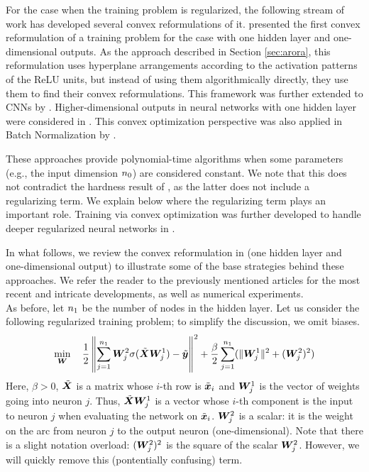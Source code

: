 For the case when the training problem is regularized, the following stream of work has developed several convex reformulations of it.
%
\cite{pilanci2020neural} presented the first convex reformulation of a training problem for the case with one hidden layer and one-dimensional outputs. As the approach described in Section \ref{sec:arora}, this reformulation uses hyperplane arrangements according to the activation patterns of the ReLU units, but instead of using them algorithmically directly, they use them to find their convex reformulations. 
%
This framework was further extended to CNNs by \cite{ergen2021implicit}.
%
Higher-dimensional outputs in neural networks with one hidden layer were considered in \cite{pmlr-v108-ergen20a,ergen2021convex,sahiner2021vectoroutput}. This convex optimization perspective was also applied in Batch Normalization by \cite{ergen2022demystifying}. 
%

These approaches provide polynomial-time algorithms when some parameters (e.g., the input dimension ${n_0}$) are considered constant. We note that this does not contradict the hardness result of \cite{froese2023training}, as the latter does not include a regularizing term. We explain below where the regularizing term plays an important role.
%
Training via convex optimization was further developed to handle deeper regularized neural networks in \cite{ergen2021global,ergen2021path,ergen2021revealing}.

In what follows, we review the convex reformulation in \cite{pilanci2020neural} (one hidden layer and one-dimensional output) to illustrate some of the base strategies behind these approaches.
%
We refer the reader to the previously mentioned articles for the most recent and intricate developments, as well as numerical experiments.\\

As before, let $n_1$ be the number of nodes in the hidden layer. Let us consider the following regularized training problem; to simplify the discussion, we omit biases.
%
\begin{equation}
    \label{eq:ERMproblemCVX}
    \min_{{\bm{W}}} \quad \frac{1}{2} \left\|\sum_{j=1}^{n_1} {\bm{W}}^2_j\sigma(\tilde{{\bm{X}}}{\bm{W}}^1_j) - \tilde{{\bm{y}}} \right\|^2 + 
    \frac{\beta}{2}\sum_{j=1}^{n_1}( \| {\bm{W}}^1_j\|^2 + ({\bm{W}}^2_j)^2)
\end{equation}
%
Here, $\beta > 0$, $\tilde{{\bm{X}}}$ is a matrix whose $i$-th row is $\tilde{{\bm{x}}}_i$ and ${\bm{W}}^1_j$ is the vector of weights going into neuron $j$. Thus, $\tilde{{\bm{X}}}{\bm{W}}^1_j$ is a vector whose $i$-th component is the input to neuron $j$ when evaluating the network on $\tilde{{\bm{x}}}_i$. ${\bm{W}}^2_j$ is a scalar: it is the weight on the arc from neuron $j$ to the output neuron (one-dimensional). Note that there is a slight notation overload: $({\bm{W}}^2_j)^2$ is the square of the scalar ${\bm{W}}^2_j$. However, we will quickly remove this (pontentially confusing) term.


